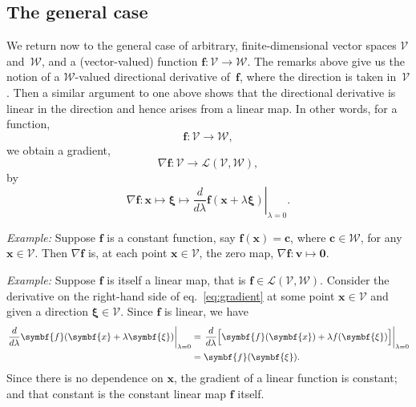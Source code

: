 \documentclass{article}
\newcommand{\V}{\mathcal{V}}
\newcommand{\W}{\mathcal{W}}
\newcommand{\vv}[1]{\symbf{#1}}
\begin{document}
\subsection{The general case}

We return now to the general case of arbitrary, finite-dimensional
vector spaces $\V$ and~$\W$, and a (vector-valued) function $\vv{f}\colon\V\to\W$.  The
remarks above give us the notion of a $\W$-valued directional
derivative of~$\vv{f}$, where the direction is taken in~$\V$.  Then a
similar argument to one above shows that the directional derivative is
linear in the direction and hence arises from a linear map. In other
words, for a function,
\begin{equation*}
  \vv{f}\colon\V\to\W,
\end{equation*}
we obtain a gradient,
\begin{equation*}
  \nabla \vv{f}\colon \V\to\mathcal{L}(\V,\W),
\end{equation*}
by
\begin{equation}\label{eq:gradient}
  \nabla \vv{f} \colon \vv{x} \mapsto \vv{\xi} \mapsto \left.\frac{d}{d\lambda}\vv{f}(\vv{x}+\lambda \vv{\xi})\right|_{\lambda=0}  .
\end{equation}

\emph{Example:} Suppose $\vv{f}$ is a constant function, say $\vv{f}(\vv{x})=\vv{c}$,
where $\vv{c}\in\W$, for any~$\vv{x}\in\V$.  Then $\nabla \vv{f}$ is, at each point $\vv{x}\in\V$,
the zero map, $\nabla \vv{f}\colon \vv{v} \mapsto \vv{0}$.

\emph{Example:} Suppose $\vv{f}$ is itself a linear map, that is
$\vv{f}\in\mathcal{L}(\V,\W)$.  Consider the derivative on the right-hand side of
eq.~\eqref{eq:gradient} at some point $\vv{x}\in\V$ and given a direction
$\vv{\xi}\in\V$.  Since $\vv{f}$ is linear, we have
\begin{equation*}
  \begin{aligned}
  \left.\frac{d}{d\lambda}\vv{f}(\vv{x}+\lambda\vv{\xi})\right|_{\lambda=0}
    &=   \left.\frac{d}{d\lambda} \Bigl[\vv{f}(\vv{x}) +\lambda f(\vv{\xi})\Bigr] \right|_{\lambda=0} \\
    &= \vv{f}(\vv{\xi}).
  \end{aligned}
\end{equation*}
Since there is no dependence on $\vv{x}$, the gradient of a linear
function is constant; and that constant is the constant linear map
$\vv{f}$ itself.
\end{document}
